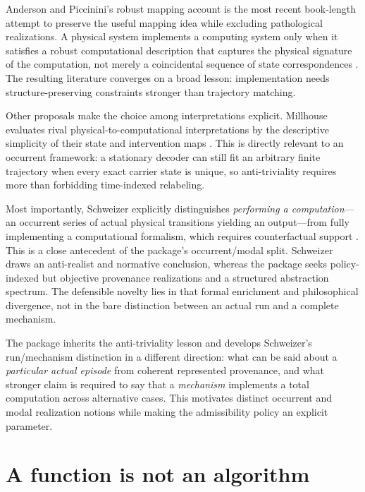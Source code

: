 \documentclass[11pt,a4paper]{article}
\begin{document}
Anderson and Piccinini's robust mapping account is the most recent book-length attempt to preserve the useful mapping idea while excluding pathological realizations. A physical system implements a computing system only when it satisfies a robust computational description that captures the physical signature of the computation, not merely a coincidental sequence of state correspondences \cite{AndersonPiccinini2024}. The resulting literature converges on a broad lesson: implementation needs structure-preserving constraints stronger than trajectory matching.

Other proposals make the choice among interpretations explicit. Millhouse evaluates rival physical-to-computational interpretations by the descriptive simplicity of their state and intervention maps \cite{Millhouse2019}. This is directly relevant to an occurrent framework: a stationary decoder can still fit an arbitrary finite trajectory when every exact carrier state is unique, so anti-triviality requires more than forbidding time-indexed relabeling.

Most importantly, Schweizer explicitly distinguishes \emph{performing a computation}---an occurrent series of actual physical transitions yielding an output---from fully implementing a computational formalism, which requires counterfactual support \cite{Schweizer2019}. This is a close antecedent of the package's occurrent/modal split. Schweizer draws an anti-realist and normative conclusion, whereas the package seeks policy-indexed but objective provenance realizations and a structured abstraction spectrum. The defensible novelty lies in that formal enrichment and philosophical divergence, not in the bare distinction between an actual run and a complete mechanism.

\begin{takeawaybox}
The package inherits the anti-triviality lesson and develops Schweizer's run/mechanism distinction in a different direction: what can be said about a \emph{particular actual episode} from coherent represented provenance, and what stronger claim is required to say that a \emph{mechanism} implements a total computation across alternative cases. This motivates distinct occurrent and modal realization notions while making the admissibility policy an explicit parameter.
\end{takeawaybox}

\section{A function is not an algorithm}
\end{document}
